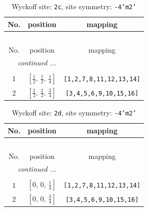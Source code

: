 \documentclass[fleqn,8pt]{jsarticle}
\begin{document}
\renewcommand{\arraystretch}{1.2}
\begin{longtable}{ccc}
\caption{Wyckoff site: {\tt 2c}, site symmetry: {\tt -4'm2'}}
 \\
 \hline \hline
No. & position & mapping \\ \hline \endfirsthead

\multicolumn{2}{l}{\tablename\ \thetable{}} \\
 \hline \hline
No. & position & mapping \\ \hline \endhead

 \hline \hline
\multicolumn{2}{r}{\footnotesize\it continued ...} \\ \endfoot

 \hline \hline
\multicolumn{2}{r}{} \\ \endlastfoot

1 & $\left[ \frac{1}{2},\, \frac{1}{2},\, \frac{1}{4} \right]$ & {\tt [1,2,7,8,11,12,13,14]} \\ \hline
2 & $\left[ \frac{1}{2},\, \frac{1}{2},\, \frac{3}{4} \right]$ & {\tt [3,4,5,6,9,10,15,16]} \\
\end{longtable}
\renewcommand{\arraystretch}{1.2}
\begin{longtable}{ccc}
\caption{Wyckoff site: {\tt 2d}, site symmetry: {\tt -4'm2'}}
 \\
 \hline \hline
No. & position & mapping \\ \hline \endfirsthead

\multicolumn{2}{l}{\tablename\ \thetable{}} \\
 \hline \hline
No. & position & mapping \\ \hline \endhead

 \hline \hline
\multicolumn{2}{r}{\footnotesize\it continued ...} \\ \endfoot

 \hline \hline
\multicolumn{2}{r}{} \\ \endlastfoot

1 & $\left[ 0,\, 0,\, \frac{1}{4} \right]$ & {\tt [1,2,7,8,11,12,13,14]} \\ \hline
2 & $\left[ 0,\, 0,\, \frac{3}{4} \right]$ & {\tt [3,4,5,6,9,10,15,16]} \\
\end{longtable}
\renewcommand{\arraystretch}{1.2}
\end{document}
